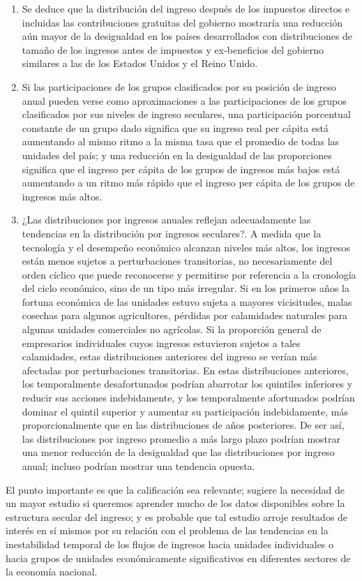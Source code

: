 \begin{enumerate}[1.]
    \item Se deduce que la distribución del ingreso después de los impuestos directos e incluidas las contribuciones gratuitas del gobierno mostraría una reducción aún mayor de la desigualdad en los países desarrollados con distribuciones de tamaño de los ingresos antes de impuestos y ex-beneficios del gobierno similares a las de los Estados Unidos y el Reino Unido.
    \item Si las participaciones de los grupos clasificados por su posición de ingreso anual pueden verse como aproximaciones a las participaciones de los grupos clasificados por sus niveles de ingreso seculares, una participación porcentual constante de un grupo dado significa que su ingreso real per cápita está aumentando al mismo ritmo a la misma tasa que el promedio de todas las unidades del país; y una reducción en la desigualdad de las proporciones significa que el ingreso per cápita de los grupos de ingresos más bajos está aumentando a un ritmo más rápido que el ingreso per cápita de los grupos de ingresos más altos.
    \item ¿Las distribuciones por ingresos anuales reflejan adecuadamente las tendencias en la distribución por ingresos seculares?. A medida que la tecnología y el desempeño económico alcanzan niveles más altos, los ingresos están menos sujetos a perturbaciones transitorias, no necesariamente del orden cíclico que puede reconocerse y permitirse por referencia a la cronología del ciclo económico, sino de un tipo más irregular. Si en los primeros años la fortuna económica de las unidades estuvo sujeta a mayores vicisitudes, malas cosechas para algunos agricultores, pérdidas por calamidades naturales para algunas unidades comerciales no agrícolas. Si la proporción general de empresarios individuales cuyos ingresos estuvieron sujetos a tales calamidades, estas distribuciones anteriores del ingreso se verían más afectadas por perturbaciones transitorias. En estas distribuciones anteriores, los temporalmente desafortunados podrían abarrotar los quintiles inferiores y reducir sus acciones indebidamente, y los temporalmente afortunados podrían dominar el quintil superior y aumentar su participación indebidamente, más proporcionalmente que en las distribuciones de años posteriores. De ser así, las distribuciones por ingreso promedio a más largo plazo podrían mostrar una menor reducción de la desigualdad que las distribuciones por ingreso anual; incluso podrían mostrar una tendencia opuesta.
\end{enumerate}
El punto importante es que la calificación sea relevante; sugiere la necesidad de un mayor estudio si queremos aprender mucho de los datos disponibles sobre la estructura secular del ingreso; y es probable que tal estudio arroje resultados de interés en sí mismos por su relación con el problema de las tendencias en la inestabilidad temporal de los flujos de ingresos hacia unidades individuales o hacia grupos de unidades económicamente significativos en diferentes sectores de la economía nacional.

